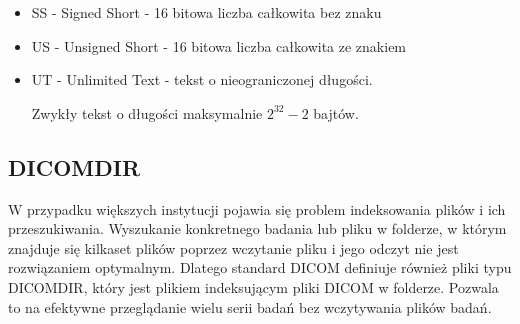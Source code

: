 \begin{itemize}
    \item SS - Signed Short - 16 bitowa liczba całkowita bez znaku
    
    \item US - Unsigned Short - 16 bitowa liczba całkowita ze znakiem

    \item UT - Unlimited Text - tekst o nieograniczonej długości.

    Zwykły tekst o długości maksymalnie $2^{32}-2$ bajtów.
\end{itemize}

\subsection{DICOMDIR}

W przypadku większych instytucji pojawia się problem indeksowania plików i ich przeszukiwania.
Wyszukanie konkretnego badania lub pliku w folderze, w którym znajduje się kilkaset plików poprzez wczytanie pliku i jego odczyt nie jest rozwiązaniem optymalnym.
Dlatego standard DICOM definiuje również pliki typu DICOMDIR, który jest plikiem indeksującym pliki DICOM w folderze.
Pozwala to na efektywne przeglądanie wielu serii badań bez wczytywania plików badań.
